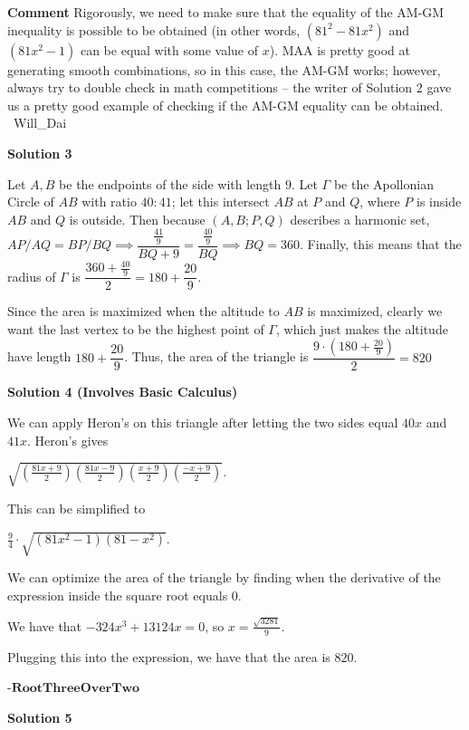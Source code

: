 \begin{enumerate}
 \textbf{Comment} Rigorously, we need to make sure that the equality of the AM-GM inequality is possible to be obtained (in other words, $(81^2 - 81x^2)$ and $(81x^2 - 1)$ can be equal with some value of $x$). MAA is pretty good at generating smooth combinations, so in this case, the AM-GM works; however, always try to double check in math competitions -- the writer of Solution 2 gave us a pretty good example of checking if the AM-GM equality can be obtained.   ~Will\_Dai

 



\textbf{Solution 3}

Let $A, B$ be the endpoints of the side with length $9$. Let $\Gamma$ be the Apollonian Circle of $AB$ with ratio $40:41$; let this intersect $AB$ at $P$ and $Q$, where $P$ is inside $AB$ and $Q$ is outside. Then because $(A, B; P, Q)$ describes a harmonic set, $AP/AQ=BP/BQ\implies \dfrac{\frac{41}{9}}{BQ+9}=\dfrac{\frac{40}{9}}{BQ}\implies BQ=360$. Finally, this means that the radius of $\Gamma$ is $\dfrac{360+\frac{40}{9}}{2}=180+\dfrac{20}{9}$.

 Since the area is maximized when the altitude to $AB$ is maximized, clearly we want the last vertex to be the highest point of $\Gamma$, which just makes the altitude have length $180+\dfrac{20}{9}$. Thus, the area of the triangle is $\dfrac{9\cdot \left(180+\frac{20}{9}\right)}{2}=\boxed{820}$




\textbf{Solution 4 (Involves Basic Calculus)}

We can apply Heron's on this triangle after letting the two sides equal $40x$ and $41x$. Heron's gives

 $\sqrt{\left(\frac{81x+9}{2} \right) \left(\frac{81x-9}{2} \right) \left(\frac{x+9}{2} \right) \left(\frac{-x+9}{2} \right)}$.

 This can be simplified to

 $\frac{9}{4} \cdot \sqrt{(81x^2-1)(81-x^2)}$.

 We can optimize the area of the triangle by finding when the derivative of the expression inside the square root equals 0.

 We have that $-324x^3+13124x=0$, so $x=\frac{\sqrt{3281}}{9}$.

 Plugging this into the expression, we have that the area is $\boxed{820}$.

 $\textbf{-RootThreeOverTwo}$




\textbf{Solution 5}


\end{enumerate}
